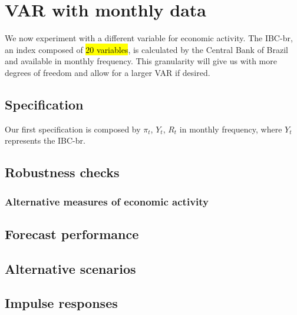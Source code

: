 \section{VAR with monthly data}
    We now experiment with a different variable for economic activity. The IBC-br, an index composed of \hl{20 variables}, is calculated by the Central Bank of Brazil and available in monthly frequency. This granularity will give us with more degrees of freedom and allow for a larger VAR if desired.
    \subsection{Specification}
        Our first specification is composed by \(\pi_t\), \(Y_t\), \(R_t\) in monthly frequency, where \(Y_t\) represents the IBC-br.
    \subsection{Robustness checks}
        \subsubsection{Alternative measures of economic activity}
    \subsection{Forecast performance}
        \lipsum[1]
    \subsection{Alternative scenarios}
        \lipsum[1]
    \subsection{Impulse responses}
        \lipsum[1]